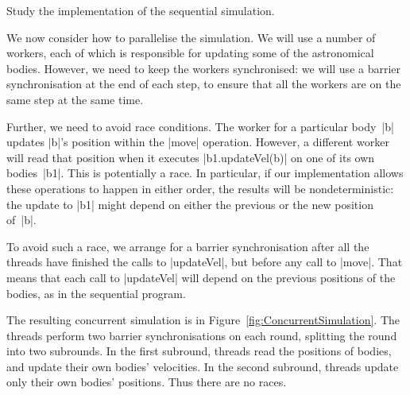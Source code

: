 
\begin{instruction}
Study the implementation of the sequential simulation.
\end{instruction}

We now consider how to parallelise the simulation.  We will use a number of
workers, each of which is responsible for updating some of the astronomical
bodies.  However, we need to keep the workers synchronised: we will use a
barrier synchronisation at the end of each step, to ensure that all the
workers are on the same step at the same time.  

Further, we need to avoid race conditions.  The worker for a particular
body~|b| updates |b|'s position within the |move| operation.  However, a
different worker will read that position when it executes |b1.updateVel(b)| on
one of its own bodies~|b1|.  This is potentially a race.  In particular, if
our implementation allows these operations to happen in either order, the
results will be nondeterministic: the update to |b1| might depend on either
the previous or the new position of~|b|.

To avoid such a race, we arrange for a barrier synchronisation after all the
threads have finished the calls to |updateVel|, but before any call to
|move|.  That means that each call to |updateVel| will depend on the previous
positions of the bodies, as in the sequential program. 

The resulting concurrent simulation is in
Figure~\ref{fig:ConcurrentSimulation}.  The threads perform two barrier
synchronisations on each round, splitting the round into two subrounds.  In
the first subround, threads read the positions of bodies, and update their own
bodies' velocities.  In the second subround, threads update only their own
bodies' positions.  Thus there are no races. 


